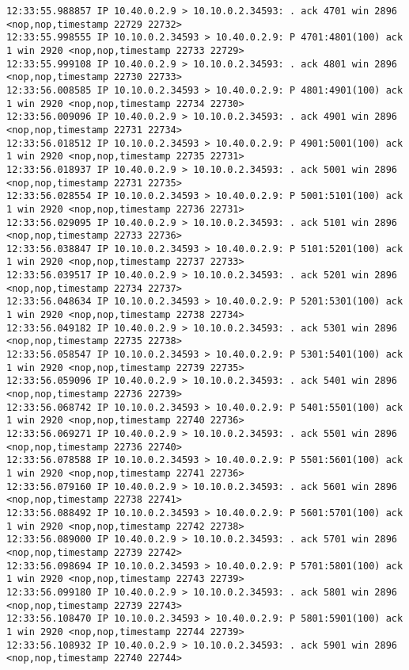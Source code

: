 \documentclass[a4paper,12pt]{article}
\begin{document}
\begin{lstlisting}
12:33:55.988857 IP 10.40.0.2.9 > 10.10.0.2.34593: . ack 4701 win 2896 <nop,nop,timestamp 22729 22732>
12:33:55.998555 IP 10.10.0.2.34593 > 10.40.0.2.9: P 4701:4801(100) ack 1 win 2920 <nop,nop,timestamp 22733 22729>
12:33:55.999108 IP 10.40.0.2.9 > 10.10.0.2.34593: . ack 4801 win 2896 <nop,nop,timestamp 22730 22733>
12:33:56.008585 IP 10.10.0.2.34593 > 10.40.0.2.9: P 4801:4901(100) ack 1 win 2920 <nop,nop,timestamp 22734 22730>
12:33:56.009096 IP 10.40.0.2.9 > 10.10.0.2.34593: . ack 4901 win 2896 <nop,nop,timestamp 22731 22734>
12:33:56.018512 IP 10.10.0.2.34593 > 10.40.0.2.9: P 4901:5001(100) ack 1 win 2920 <nop,nop,timestamp 22735 22731>
12:33:56.018937 IP 10.40.0.2.9 > 10.10.0.2.34593: . ack 5001 win 2896 <nop,nop,timestamp 22731 22735>
12:33:56.028554 IP 10.10.0.2.34593 > 10.40.0.2.9: P 5001:5101(100) ack 1 win 2920 <nop,nop,timestamp 22736 22731>
12:33:56.029095 IP 10.40.0.2.9 > 10.10.0.2.34593: . ack 5101 win 2896 <nop,nop,timestamp 22733 22736>
12:33:56.038847 IP 10.10.0.2.34593 > 10.40.0.2.9: P 5101:5201(100) ack 1 win 2920 <nop,nop,timestamp 22737 22733>
12:33:56.039517 IP 10.40.0.2.9 > 10.10.0.2.34593: . ack 5201 win 2896 <nop,nop,timestamp 22734 22737>
12:33:56.048634 IP 10.10.0.2.34593 > 10.40.0.2.9: P 5201:5301(100) ack 1 win 2920 <nop,nop,timestamp 22738 22734>
12:33:56.049182 IP 10.40.0.2.9 > 10.10.0.2.34593: . ack 5301 win 2896 <nop,nop,timestamp 22735 22738>
12:33:56.058547 IP 10.10.0.2.34593 > 10.40.0.2.9: P 5301:5401(100) ack 1 win 2920 <nop,nop,timestamp 22739 22735>
12:33:56.059096 IP 10.40.0.2.9 > 10.10.0.2.34593: . ack 5401 win 2896 <nop,nop,timestamp 22736 22739>
12:33:56.068742 IP 10.10.0.2.34593 > 10.40.0.2.9: P 5401:5501(100) ack 1 win 2920 <nop,nop,timestamp 22740 22736>
12:33:56.069271 IP 10.40.0.2.9 > 10.10.0.2.34593: . ack 5501 win 2896 <nop,nop,timestamp 22736 22740>
12:33:56.078588 IP 10.10.0.2.34593 > 10.40.0.2.9: P 5501:5601(100) ack 1 win 2920 <nop,nop,timestamp 22741 22736>
12:33:56.079160 IP 10.40.0.2.9 > 10.10.0.2.34593: . ack 5601 win 2896 <nop,nop,timestamp 22738 22741>
12:33:56.088492 IP 10.10.0.2.34593 > 10.40.0.2.9: P 5601:5701(100) ack 1 win 2920 <nop,nop,timestamp 22742 22738>
12:33:56.089000 IP 10.40.0.2.9 > 10.10.0.2.34593: . ack 5701 win 2896 <nop,nop,timestamp 22739 22742>
12:33:56.098694 IP 10.10.0.2.34593 > 10.40.0.2.9: P 5701:5801(100) ack 1 win 2920 <nop,nop,timestamp 22743 22739>
12:33:56.099180 IP 10.40.0.2.9 > 10.10.0.2.34593: . ack 5801 win 2896 <nop,nop,timestamp 22739 22743>
12:33:56.108470 IP 10.10.0.2.34593 > 10.40.0.2.9: P 5801:5901(100) ack 1 win 2920 <nop,nop,timestamp 22744 22739>
12:33:56.108932 IP 10.40.0.2.9 > 10.10.0.2.34593: . ack 5901 win 2896 <nop,nop,timestamp 22740 22744>

\end{lstlisting}
\end{document}
